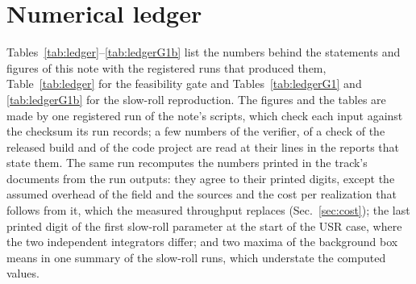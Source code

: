 \documentclass[aps,prd,twocolumn,10pt,superscriptaddress,nofootinbib,longbibliography,floatfix]{revtex4-2}
\begin{document}
\section{Numerical ledger}\label{app:ledger}

Tables~\ref{tab:ledger}--\ref{tab:ledgerG1b} list the numbers behind the statements and figures of this note with the registered runs that produced them, Table~\ref{tab:ledger} for the feasibility gate and Tables~\ref{tab:ledgerG1} and \ref{tab:ledgerG1b} for the slow-roll reproduction. The figures and the tables are made by one registered run of the note's scripts, which check each input against the checksum its run records; a few numbers of the verifier, of a check of the released build and of the code project are read at their lines in the reports that state them. The same run recomputes the numbers printed in the track's documents from the run outputs: they agree to their printed digits, except the assumed overhead of the field and the sources and the cost per realization that follows from it, which the measured throughput replaces (Sec.~\ref{sec:cost}); the last printed digit of the first slow-roll parameter at the start of the USR case, where the two independent integrators differ; and two maxima of the background box means in one summary of the slow-roll runs, which understate the computed values.






\end{document}
